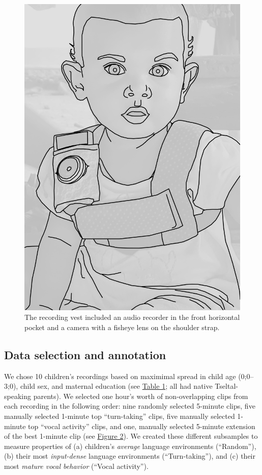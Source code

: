 \documentclass[floatsintext,man]{apa6}
\theoremstyle{definition}
\theoremstyle{definition}
\theoremstyle{definition}
\theoremstyle{remark}
\begin{document}
\begin{figure}

{\centering \includegraphics[width=0.5\linewidth]{Tseltal-CLE_files/TseltalCLE-RecordingVest} 

}

\caption{The recording vest included an audio recorder in the front horizontal pocket and a camera with a fisheye lens on the shoulder strap.}\label{fig:fig1}
\end{figure}

\subsection{Data selection and annotation}\label{methods-samples}

We chose 10 children's recordings based on maximimal spread in child age
(0;0--3;0), child sex, and maternal education (see
\protect\hyperlink{tab1}{Table 1}; all had native Tseltal-speaking
parents). We selected one hour's worth of non-overlapping clips from
each recording in the following order: nine randomly selected 5-minute
clips, five manually selected 1-minute top \enquote{turn-taking} clips,
five manually selected 1-minute top \enquote{vocal activity} clips, and
one, manually selected 5-minute extension of the best 1-minute clip (see
\protect\hyperlink{fig2}{Figure 2}). We created these different
subsamples to measure properties of (a) children's \emph{average}
language environments (\enquote{Random}), (b) their most
\emph{input-dense} language environments (\enquote{Turn-taking}), and
(c) their most \emph{mature vocal behavior} (\enquote{Vocal activity}).
\end{document}
